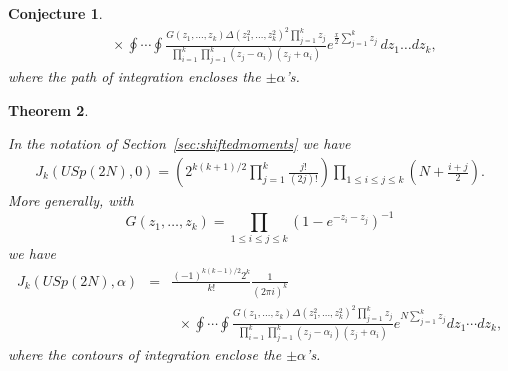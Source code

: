 \documentclass[12pt,letterpaper]{amsart}
\theoremstyle{plain}
\newtheorem{theorem}{Theorem}[section]
\newtheorem{conjecture}[theorem]{Conjecture}
\theoremstyle{definition}
\theoremstyle{remark}
\numberwithin{equation}{subsection}
\numberwithin{theorem}{subsection}
\numberwithin{table}{subsection}
\begin{document}
\begin{conjecture}
\begin{eqnarray}
&   &\ \ \times \oint \cdots \oint 
\frac{G(z_1,
\dots,z_{k})\Delta(z_1^2,\dots,z_{k}^2)^2 \prod_{j=1}^{k} z_j}
{\displaystyle \prod_{i =1}^{k} \prod_{j=1}^{k} (z_j -
\alpha_i)(z_j+\alpha_{i}) } 
e^{\tfrac x2 \sum_{j=1}^{k}z_j}\,dz_1\dots dz_{k}, \end{eqnarray}
where the path of integration encloses the $\pm \alpha$'s.
\end{conjecture}



\begin{theorem} \label{thm:USp2Nk}

   In the notation of Section~\ref{sec:shiftedmoments} we have
\begin{eqnarray}
J_k(USp(2N),0) =\left( 2^{k(k+1)/2} \prod_{j=1}^k \frac{j!}{(2j)!}
\right) \prod_{1\leq i\leq j\leq k} (N+\tfrac{i+j}{2}). 
\end{eqnarray}
More generally, with 
$$
G(z_1,\dots,z_k) =  \prod_{1\leq i\le j \leq k}
(1-e^{-z_{i}-z_{j}})^{-1}
$$
we have
\begin{eqnarray}
J_k(USp(2N),\alpha) & =  &
\frac{(-1)^{k(k-1)/2}2^k}{k!}\frac{1}{(2\pi i)^{k}} \nonumber \\
& &\ \ \times  \oint\cdots \oint 
\frac{ G(z_1,\dots,z_k) \Delta(z_1^2,\ldots,z_{k}^2)^2 
\prod_{j=1}^{k} z_j} { \displaystyle \prod_{i=1}^{k} \prod_{j=1}^{k}
(z_j-\alpha_i)(z_j+\alpha_i)}e^{N\sum_{j=1}^k z_j } dz_1\cdots
dz_{k}  , 
\end{eqnarray} 
where the contours of integration enclose the $\pm \alpha$'s.
\end{theorem}
\end{document}
